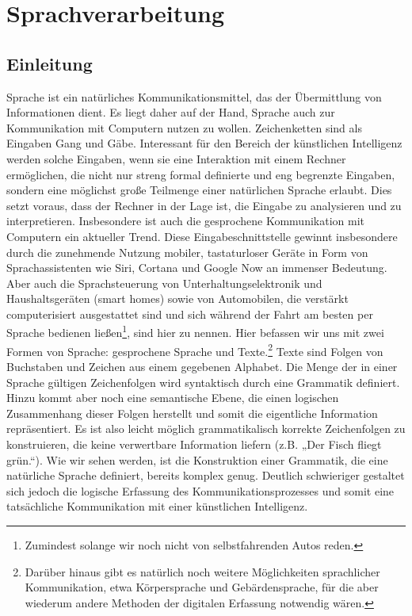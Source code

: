 
\chapter{Sprachverarbeitung}
\section{Einleitung}
Sprache ist ein natürliches Kommunikationsmittel, das der Übermittlung von Informationen dient.
Es liegt daher auf der Hand, Sprache auch zur Kommunikation mit Computern nutzen zu wollen.
Zeichenketten sind als Eingaben Gang und Gäbe.
Interessant für den Bereich der künstlichen Intelligenz werden solche Eingaben, wenn sie eine Interaktion mit einem Rechner ermöglichen, die nicht nur streng formal definierte und eng begrenzte Eingaben, sondern eine möglichst große Teilmenge einer natürlichen Sprache erlaubt.
Dies setzt voraus, dass der Rechner in der Lage ist, die Eingabe zu analysieren und zu interpretieren.
Insbesondere ist auch die gesprochene Kommunikation mit Computern ein aktueller Trend.
Diese Eingabeschnittstelle gewinnt insbesondere durch die zunehmende Nutzung mobiler, tastaturloser Geräte in Form von Sprachassistenten wie Siri, Cortana und Google Now an immenser Bedeutung.
Aber auch die Sprachsteuerung von Unterhaltungselektronik und Haushaltsgeräten (smart homes) sowie von Automobilen, die verstärkt computerisiert ausgestattet sind und sich während der Fahrt am besten per Sprache bedienen ließen\footnote{Zumindest solange wir noch nicht von selbstfahrenden Autos reden.}, sind hier zu nennen.
Hier befassen wir uns mit zwei Formen von Sprache: gesprochene Sprache und Texte.\footnote{Darüber hinaus gibt es natürlich noch weitere Möglichkeiten sprachlicher Kommunikation, etwa Körpersprache und Gebärdensprache, für die aber wiederum andere Methoden der digitalen Erfassung notwendig wären.}
Texte sind Folgen von Buchstaben und Zeichen aus einem gegebenen Alphabet.
Die Menge der in einer Sprache gültigen Zeichenfolgen wird syntaktisch durch eine Grammatik definiert.
Hinzu kommt aber noch eine semantische Ebene, die einen logischen Zusammenhang dieser Folgen herstellt und somit die eigentliche Information repräsentiert.
Es ist also leicht möglich grammatikalisch korrekte Zeichenfolgen zu konstruieren, die keine verwertbare Information liefern (z.B.
„Der Fisch fliegt grün.“).
Wie wir sehen werden, ist die Konstruktion einer Grammatik, die eine natürliche Sprache definiert, bereits komplex genug.
Deutlich schwieriger gestaltet sich jedoch die logische Erfassung des Kommunikationsprozesses und somit eine tatsächliche Kommunikation mit einer künstlichen Intelligenz.
